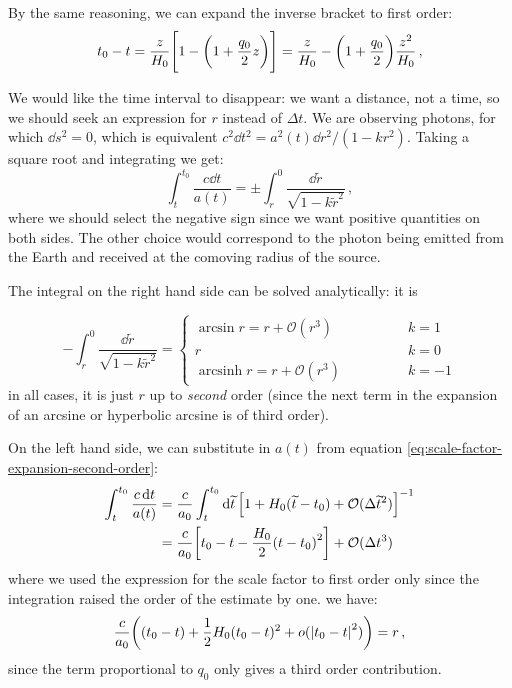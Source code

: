 \documentclass[main.tex]{subfiles}
\begin{document}
By the same reasoning, we can expand the inverse bracket to first order: 
%
\begin{align}
t_0 - t = \frac{z}{H_0 } \qty[1 - \qty(1 + \frac{q_0}{2} z)]
= \frac{z}{H_0 } - \qty(1 + \frac{q_0}{2}) \frac{z^2}{H_0 }
\,,
\end{align}
%


We would like the time interval to disappear: we want a distance, not a time, so we should seek an expression for \(r\) instead of \(\Delta t\).
We are observing photons, for which \(\dd{s^2} =0\), which is equivalent \(c^2 \dd{t^2} = a^2 (t) \dd{r^2} / (1-kr^2) \).
Taking a square root and integrating we get:
\begin{equation}
\int_{t}^{t_0 } \frac{c \dd{t}}{a(t)}
= \pm \int_r^0 \frac{\dd{\widetilde{r}}}{\sqrt{1-k \widetilde{r}^2}}
\,,
\end{equation}
%
where we should select the negative sign since we want positive quantities on both sides. The other choice would correspond to the photon being emitted from the Earth and received at the comoving radius of the source. 

The integral on the right hand side can be solved analytically: it is 

\begin{equation}
-\int_{r}^{0} \frac{ \dd{\widetilde{r}}}{\sqrt{1 - k \widetilde{r}^2}} =
\begin{cases}
  \arcsin r =r + \mathcal{O}(r^3) &k =1 \\
  r  &k=0 \\
  \operatorname{arcsinh} r =r + \mathcal{O}(r^3)\qquad\qquad  &k= -1
\end{cases}
\end{equation}
%
in all cases, it is just \(r\) up to \emph{second} order (since the next term in the expansion of an arcsine or hyperbolic arcsine is of third order).

On the left hand side, we can substitute in \(a(t)\) from equation \eqref{eq:scale-factor-expansion-second-order}:
\begin{align}
\int_{t}^{t_0} \frac{c\dd{t}}{a(t)} 
&= \frac{c}{a_0 }
\int_{t }^{t_0 } \dd{\widetilde{t}} \qty[1 + H_0 (\widetilde{t} - t_0) + \mathcal{O}(\Delta \widetilde{t}^2)]^{-1}  \\
&= \frac{c}{a_0 } \qty[t_0  - t - \frac{H_0}{2} \qty(t-t_0 )^2] + \mathcal{O}(\Delta t^3)
\end{align}
%
where we used the expression for the scale factor to first order only since the integration raised the order of the estimate by one.
we have:
\begin{equation}
  \frac{c}{a_0 } \qty((t_0 - t) + \frac{1}{2} H_0 (t_0 - t)^2 + o(\abs{t_0 - t} ^2)) = r \,,
\end{equation}
%
since the term proportional to \(q_0 \) only gives a third order contribution.
\end{document}
